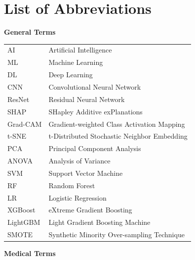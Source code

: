\documentclass[12pt, a4paper]{article}
\begin{document}
\listoftables


\clearpage

\section*{List of Abbreviations}

\textbf{General Terms}

\begin{tabular}{ll}
AI & Artificial Intelligence \\
ML & Machine Learning \\
DL & Deep Learning \\
CNN & Convolutional Neural Network \\
ResNet & Residual Neural Network \\
SHAP & SHapley Additive exPlanations \\
Grad-CAM & Gradient-weighted Class Activation Mapping \\
t-SNE & t-Distributed Stochastic Neighbor Embedding \\
PCA & Principal Component Analysis \\
ANOVA & Analysis of Variance \\
SVM & Support Vector Machine \\
RF & Random Forest \\
LR & Logistic Regression \\
XGBoost & eXtreme Gradient Boosting \\
LightGBM & Light Gradient Boosting Machine \\
SMOTE & Synthetic Minority Over-sampling Technique \\
\end{tabular}

\vspace{0.5cm}
\textbf{Medical Terms}
\end{document}

